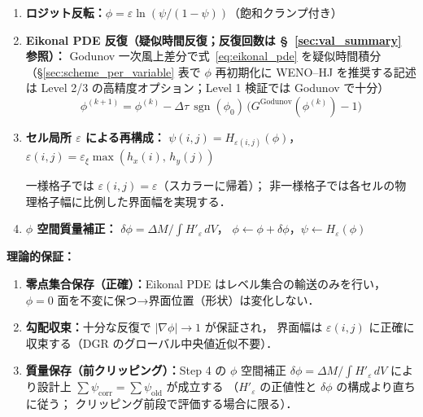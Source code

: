 \begin{tcolorbox}[algbox, title={Eikonal 再初期化アルゴリズム}]
\begin{enumerate}
  \item \textbf{ロジット反転：}$\phi = \varepsilon\ln(\psi/(1-\psi))$（飽和クランプ付き）
  \item \textbf{Eikonal PDE 反復（疑似時間反復；反復回数は §~\ref{sec:val_summary} 参照）：}
        Godunov 一次風上差分で式~\eqref{eq:eikonal_pde} を疑似時間積分
        （\S\ref{sec:scheme_per_variable} 表で $\phi$ 再初期化に WENO--HJ を推奨する記述は
        Level 2/3 の高精度オプション；Level 1 検証では Godunov で十分）
        \begin{equation}
          \phi^{(k+1)} = \phi^{(k)} - \Delta\tau\,\operatorname{sgn}(\phi_0)\,
          \bigl(G^{\mathrm{Godunov}}(\phi^{(k)}) - 1\bigr)
        \end{equation}
  \item \textbf{セル局所 $\varepsilon$ による再構成：}
        $\psi(i,j) = H_{\varepsilon(i,j)}(\phi)$，
        $\varepsilon(i,j) = \varepsilon_\xi\max(h_x(i),\,h_y(j))$

        一様格子では $\varepsilon(i,j) = \varepsilon$（スカラーに帰着）；
        非一様格子では各セルの物理格子幅に比例した界面幅を実現する．
  \item \textbf{$\phi$ 空間質量補正：}
        $\delta\phi = \Delta M / \int H'_\varepsilon\,dV$，
        $\phi \leftarrow \phi + \delta\phi$，$\psi \leftarrow H_{\varepsilon}(\phi)$
\end{enumerate}
\end{tcolorbox}

\noindent\textbf{理論的保証：}
\begin{enumerate}
  \item \textbf{零点集合保存（正確）：}Eikonal PDE はレベル集合の輸送のみを行い，
        $\phi = 0$ 面を不変に保つ→界面位置（形状）は変化しない．
  \item \textbf{勾配収束：}十分な反復で $|\nabla\phi|\to 1$ が保証され，
        界面幅は $\varepsilon(i,j)$ に正確に収束する（DGR のグローバル中央値近似不要）．
  \item \textbf{質量保存（前クリッピング）：}Step 4 の $\phi$ 空間補正
        $\delta\phi=\Delta M/\!\int H'_\varepsilon\,dV$ により設計上
        $\sum\psi_{\mathrm{corr}}=\sum\psi_{\mathrm{old}}$ が成立する
        （$H'_\varepsilon$ の正値性と $\delta\phi$ の構成より直ちに従う；
        クリッピング前段で評価する場合に限る）．
\end{enumerate}

